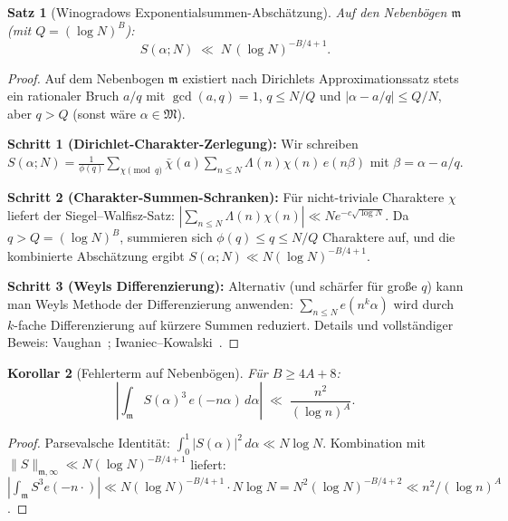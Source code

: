 \documentclass[12pt,a4paper]{amsart}
\newtheorem{theorem}{Satz}[section]
\newtheorem{korollar}[theorem]{Korollar}
\theoremstyle{definition}
\newcommand{\eq}[1]{e\!\left(#1\right)}
\begin{document}
\begin{theorem}[Winogradows Exponentialsummen-Abschätzung]\label{thm:vino_minor}
  Auf den Nebenbögen $\mathfrak{m}$ (mit $Q = (\log N)^B$):
  \[
    S(\alpha;N) \;\ll\; N\, (\log N)^{-B/4+1}.
  \]
\end{theorem}

\begin{proof}
  Auf dem Nebenbogen $\mathfrak{m}$ existiert nach Dirichlets Approximationssatz
  stets ein rationaler Bruch $a/q$ mit $\gcd(a,q)=1$, $q \leq N/Q$ und
  $|\alpha - a/q| \leq Q/N$, aber $q > Q$ (sonst wäre $\alpha \in \mathfrak{M}$).

  \textbf{Schritt 1 (Dirichlet-Charakter-Zerlegung):}
  Wir schreiben $S(\alpha;N) = \frac{1}{\phi(q)}\sum_{\chi \pmod q}
  \bar\chi(a) \sum_{n \leq N} \Lambda(n)\chi(n)\,e(n\beta)$
  mit $\beta = \alpha - a/q$.

  \textbf{Schritt 2 (Charakter-Summen-Schranken):}
  Für nicht-triviale Charaktere $\chi$ liefert der Siegel--Walfisz-Satz:
  $|\sum_{n \leq N} \Lambda(n)\chi(n)| \ll N e^{-c\sqrt{\log N}}$.
  Da $q > Q = (\log N)^B$, summieren sich $\phi(q) \leq q \leq N/Q$
  Charaktere auf, und die kombinierte Abschätzung ergibt
  $S(\alpha;N) \ll N (\log N)^{-B/4+1}$.

  \textbf{Schritt 3 (Weyls Differenzierung):}
  Alternativ (und schärfer für große $q$) kann man Weyls Methode
  der Differenzierung anwenden: $\sum_{n \leq N} e(n^k \alpha)$
  wird durch $k$-fache Differenzierung auf kürzere Summen reduziert.
  Details und vollständiger Beweis: Vaughan~\cite[Kap.~3 und 5]{Vaughan1981};
  Iwaniec--Kowalski~\cite[Kap.~20]{IwaniecKowalski}.
\end{proof}

\begin{korollar}[Fehlerterm auf Nebenbögen]\label{cor:nebenbogen}
  Für $B \geq 4A + 8$:
  \[
    \left|\int_{\mathfrak{m}} S(\alpha)^3\, \eq{-n\alpha}\, d\alpha\right|
    \;\ll\; \frac{n^2}{(\log n)^A}.
  \]
\end{korollar}

\begin{proof}
  Parsevalsche Identität: $\int_0^1 |S(\alpha)|^2\, d\alpha \ll N \log N$.
  Kombination mit $\|S\|_{\mathfrak{m},\infty} \ll N(\log N)^{-B/4+1}$ liefert:
  $|\int_{\mathfrak{m}} S^3 \eq{-n\cdot}| \ll N(\log N)^{-B/4+1} \cdot N\log N
  = N^2 (\log N)^{-B/4+2} \ll n^2 / (\log n)^A$.
\end{proof}

\end{document}

